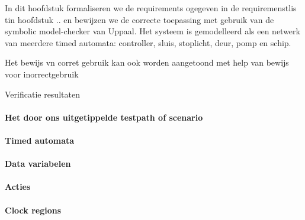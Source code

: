 In dit hoofdstuk formaliseren we de requirements ogegeven in de requiremenstlis tin hoofdstuk .. en bewijzen we de correcte toepassing met gebruik van de symbolic model-checker van Uppaal.
 Het systeem is gemodelleerd als een netwerk van meerdere timed automata: controller, sluis, stoplicht, deur, pomp en schip.
 
 Het bewijs vn corret gebruik kan ook worden aangetoond met help van bewijs voor inorrectgebruik
 
 
 Verificatie resultaten
 \paragraph{Het door ons uitgetippelde testpath of scenario}
 
 \paragraph{Timed automata}
 
 
\paragraph{Data variabelen}

\paragraph{Acties}
 
\paragraph{Clock regions}
\cite{clarke2000Modelchecking21}
\cite{clarke2000Modelchecking212}
\cite{clarke2000Modelchecking223}
\cite{clarke2000Modelchecking31}
\cite{clarke2000Modelchecking32}
\cite{clarke2000Modelchecking33}
\cite{clarke2000Modelchecking411}
\cite{clarke2000Modelchecking43}
\cite{clarke2000Modelchecking63}
\cite{clarke2000Modelchecking64}
\cite{clarke2000Modelchecking661}
\cite{clarke2000Modelchecking91}
\cite{clarke2000Modelchecking102}
\cite{clarke2000Modelchecking11}
\cite{clarke2000Modelchecking122}
\cite{clarke2000Modelchecking123}
\cite{clarke2000Modelchecking132}
\cite{clarke2000Modelchecking1321}
\cite{clarke2000Modelchecking152}
\cite{clarke2000Modelchecking171}
\cite{clarke2000Modelchecking172}
\cite{clarke2000Modelchecking173}
\cite{audioSemanticsBengtsson}
\cite{guidingAutomataBberm}
\cite{gearTransitionLindahl1}
\cite{gearTransitionLindahl2}
\cite{martinelliScada}
\cite{IgbalReconstructurintTransition1}
\cite{IgbalReconstructurintTransition2}
\cite{huangVerficationStoch}
\cite{bengtssonUppaalVerification}
\cite{pranaliVerificationWaterLevel}
\cite{alexandreUppaalDefinition}
\cite{behzadEvalQOS}
\cite{behzadVariablesQoS}
\cite{alur}
\cite{alurDenseRealTime}
\cite{alurSystemClok}
\cite{alurModelHybrid}
\cite{rijksoverheidSluizen}
\cite{rijksoverheidSluisStroomschema}

